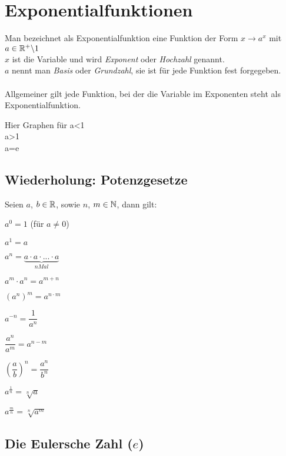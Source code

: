 \chapter{Exponentialfunktionen}

\begin{Definition}
Man bezeichnet als Exponentialfunktion eine Funktion der Form $x\rightarrow a^x$ mit $a\in \mathbb{R}^+\backslash 1$\\
$x$ ist die Variable und wird \textit{Exponent} oder \textit{Hochzahl} genannt.\\
$a$ nennt man \textit{Basis} oder \textit{Grundzahl}, sie ist für jede Funktion fest forgegeben.\\\\
Allgemeiner gilt jede Funktion, bei der die Variable im Exponenten steht als Exponentialfunktion. 
\end{Definition}

Hier Graphen für a<1\\
a>1\\
a=e\\


		\section{Wiederholung: Potenzgesetze}
Seien $a$, $b\in\mathbb{R}$, sowie $n$, $m\in\mathbb{N}$, dann gilt:
\begin{enumerate}
\begin{minipage}{0.5\textwidth}
\item$a^0=1$ (für $a\neq 0$)
\item$a^1=a$
\item$a^n=\underbrace{a\cdot a\cdot ... \cdot a}_{n Mal}$
\item$a^m\cdot a^n=a^{m+n}$
\item$(a^n)^m=a^{n\cdot m}$
\end {minipage}
\begin{minipage}{0.5\textwidth}
\item$a^{-n}=\dfrac{1}{a^n}$
\item$\dfrac{a^n}{a^m}=a^{n-m}$
\item$\left(\dfrac{a}{b}\right)^n=\dfrac{a^n}{b^n}$
\item $a^{\frac{1}{n}}=\sqrt[n]{a}$
\item$a^{\frac{m}{n}}=\sqrt[n]{a^m}$
\end {minipage}
\end{enumerate}

		\section{Die Eulersche Zahl ($e$)}

